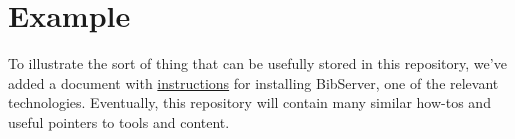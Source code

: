 \documentclass{article}
\begin{document}
\section{Example}

To illustrate the sort of thing that can be usefully stored in this repository, we've added a document with \href{http://holtzermann17.github.io/skelodml/bibserver-setup.html}{instructions} for installing BibServer, one of the relevant technologies.  Eventually, this repository will contain many similar how-tos and useful pointers to tools and content.
\end{document}
